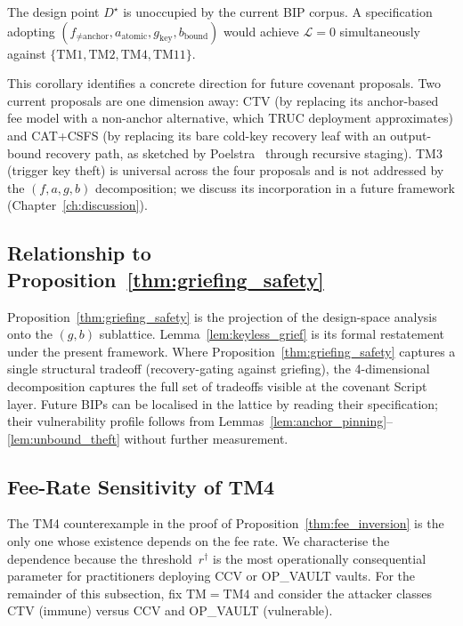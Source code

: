 \begin{corollary}\label{cor:open_corner}
The design point $D^\star$ is unoccupied by the current BIP corpus. A
specification adopting $(f_{\neq\text{anchor}}, a_{\text{atomic}},
g_{\text{key}}, b_{\text{bound}})$ would achieve $\mathcal{L} = 0$
simultaneously against $\{\mathrm{TM1}, \mathrm{TM2}, \mathrm{TM4},
\mathrm{TM11}\}$.
\end{corollary}

This corollary identifies a concrete direction for future covenant
proposals. Two current proposals are one dimension away: CTV (by
replacing its anchor-based fee model with a non-anchor alternative,
which TRUC deployment approximates) and CAT+CSFS (by replacing its
bare cold-key recovery leaf with an output-bound recovery path, as
sketched by Poelstra~\cite{Poe21} through recursive staging).
TM3 (trigger key theft) is universal across the four proposals and is
not addressed by the $(f, a, g, b)$ decomposition; we discuss its
incorporation in a future framework (Chapter~\ref{ch:discussion}).

\subsection{Relationship to Proposition~\ref{thm:griefing_safety}}
\label{ss:relation_griefing}

Proposition~\ref{thm:griefing_safety} is the projection of the
design-space analysis onto the $(g, b)$ sublattice.
Lemma~\ref{lem:keyless_grief} is its formal restatement under the
present framework. Where Proposition~\ref{thm:griefing_safety}
captures a single structural tradeoff (recovery-gating against
griefing), the 4-dimensional decomposition captures the full set of
tradeoffs visible at the covenant Script layer. Future BIPs can be
localised in the lattice by reading their specification; their
vulnerability profile follows from
Lemmas~\ref{lem:anchor_pinning}--\ref{lem:unbound_theft} without
further measurement.

\subsection{Fee-Rate Sensitivity of TM4}
\label{ss:tm4_sensitivity}

The TM4 counterexample in the proof of Proposition~\ref{thm:fee_inversion}
is the only one whose existence depends on the fee rate. We
characterise the dependence because the threshold~$r^\dagger$ is the
most operationally consequential parameter for practitioners deploying
CCV or OP\_VAULT vaults. For the remainder of this subsection, fix
$\mathrm{TM} = \mathrm{TM4}$ and consider the attacker classes CTV
(immune) versus CCV and OP\_VAULT (vulnerable).

